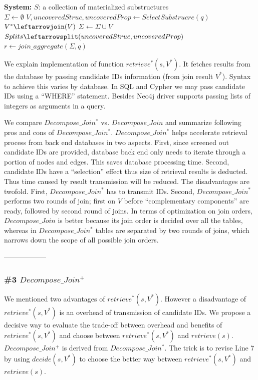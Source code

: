 \begin{algorithm}[H]
\caption{$Decompose\_Join^{*}$}
\LinesNumbered
\textbf{System:} $S$: a collection of materialized substructures\\
$\Sigma \gets \emptyset $\;
$V, uncoveredStruc, uncoveredProp \gets SelectSubstrucre(q) $\;
$V^{*}\leftarrowjoin(V)$\;
$\Sigma \gets \Sigma \cup V $\;
$Splits\leftarrowsplit(uncoveredStruc, uncoveredProp)$\;
$r \leftarrow join\_aggregate(\Sigma, q)$\;
\end{algorithm}


We explain implementation of function $retrieve^{*}(s, V^{*})$. It fetches results from the database by passing candidate IDs information (from join result $V^{*}$). Syntax to achieve this varies by database. In SQL and Cypher we may pass candidate IDs using a ``WHERE'' statement. Besides Neo4j driver supports passing lists of integers as arguments in a query.


We compare $Decompose\_Join^{*}$ vs.  $Decompose\_Join$ and summarize following pros and cons of $Decompose\_Join^{*}$. $Decompose\_Join^{*}$ helps accelerate retrieval process from back end databases in two aspects. First, since screened out candidate IDs are provided, database back end only needs to iterate through a portion of nodes and edges. This saves database processing time. Second, candidate IDs have a ``selection'' effect thus size of retrieval results is deducted. Thus time caused by result transmission will be reduced. The disadvantages are twofold. First, $Decompose\_Join^{*}$ has to transmit IDs. Second,  $Decompose\_Join^{*}$ performs two rounds of join; first on $V$ before ``complementary components'' are ready,  followed by second round of joins. In terms of optimization on join orders, $Decompose\_Join$ is better because its join order is decided over all the tables, whereas in $Decompose\_Join^{*}$ tables are separated by two rounds of joins, which narrows down the scope of all possible join orders.

------------------
\subsubsection{\#3 $Decompose\_Join^{+}$}
We mentioned two advantages of $retrieve^{*}(s, V^{*})$. However a disadvantage of $retrieve^{*}(s, V^{*})$ is an overhead of transmission of candidate IDs. We propose a decisive way to evaluate the trade-off between overhead and benefits of $retrieve^{*}(s, V^{*})$ and choose between $retrieve^{*}(s, V^{*})$ and $retrieve(s)$. $Decompose\_Join^{+}$ is derived from $Decompose\_Join^{*}$. The trick is to revise Line 7 by using $decide(s,V^{*})$ to choose the better way between $retrieve^{*}(s, V^{*})$ and $retrieve(s)$.

